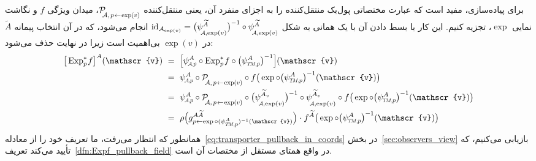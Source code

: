 برای پیاده‌سازی، مفید است که عبارت مختصاتی پول‌بک منتقل‌کننده را به اجزای منفرد آن، یعنی منتقل‌کننده
$\mathcal{P}_{\mkern-4mu\overset{}{\protect\scalebox{.75}{$\!\A$},\protect\scalebox{.75}{$\, p\!\leftarrow\!\exp(v)$}}}$،
میدان ویژگی $f$ و نگاشت نمایی $\exp$، تجزیه کنیم.
این کار با بسط دادن آن با یک همانی به شکل
$\id_{\A_{\exp(v)}} = \big(\psiAexpnop^{\widetilde{A}} \big)^{-1} \circ \psiAexpnop^{\widetilde{A}}$
انجام می‌شود، که در آن انتخاب پیمانه $\widetilde{A}$ در $\exp(v)$ بی‌اهمیت است زیرا در نهایت حذف می‌شود:
\begin{align}\label{eq:coordinate_expression_transporter_pullback_62}
    \big[\Expspf \big]^A (\mathscr{v})
    \ &=\ \pig[ \psiAp^A \circ \Expspf \circ \big(\psiTMp^A \big)^{-1} \pig] (\mathscr{v}) \notag \\
    \ &=\ \psiAp^A \circ 
        \mathcal{P}_{\mkern-4mu\overset{}{\protect\scalebox{.75}{$\!\A$},\protect\scalebox{.75}{$\, p\!\leftarrow\!\exp(v)$}}}
     \circ f \big( \exp \circ \big(\psiTMp^A\big)^{-1} (\mathscr{v})\big) \notag \\
    \ &=\ \psiAp^A \circ 
        \mathcal{P}_{\mkern-4mu\overset{}{\protect\scalebox{.75}{$\!\A$},\protect\scalebox{.75}{$\, p\!\leftarrow\!\exp(v)$}}}
     \circ \big(\psiAexpnop^{\widetilde{A}_v} \big)^{-1} \circ \psiAexpnop^{\widetilde{A}_v}
     \circ f \big( \exp \circ \big(\psiTMp^A\big)^{-1} (\mathscr{v})\big) \notag \\
    \ &=\ \rho\pig( g^{A\widetilde{A}}_{p\leftarrow\exp\circ (\psiTMp^A)^{-1}(\mathscr{v})} \pig) \mkern1mu
     \cdot f^{\widetilde{A}} \big( \exp \circ \big(\psiTMp^A\big)^{-1} (\mathscr{v})\big) \notag \\
\end{align}
همانطور که انتظار می‌رفت، ما تعریف خود را از معادله~\eqref{eq:transporter_pullback_in_coords} در بخش~\ref{sec:observers_view} بازیابی می‌کنیم، که تأیید می‌کند تعریف~\ref{dfn:Expf_pullback_field} در واقع همتای مستقل از مختصات آن است.



